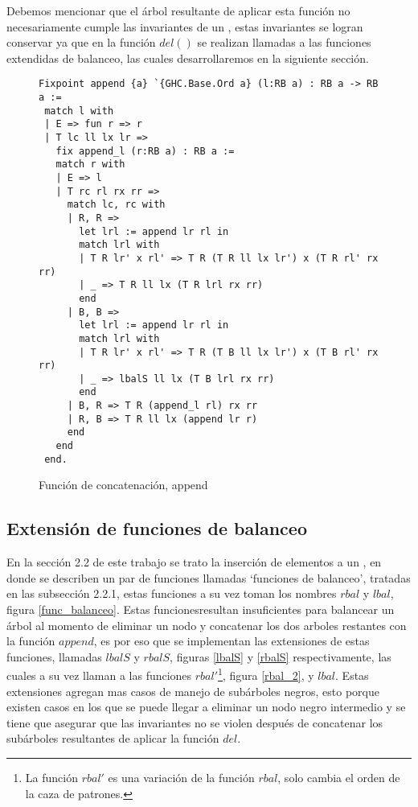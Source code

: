 Debemos mencionar que el \'arbol resultante de aplicar esta funci\'on no necesariamente cumple las
invariantes de un {\arn}, estas invariantes se logran conservar ya que en la funci\'on $del()$ se
realizan llamadas a las funciones extendidas de balanceo, las cuales desarrollaremos en la
siguiente sección.

\begin{figure}
\centering
\captionsetup{justification=centering}
\begin{verbatim}
Fixpoint append {a} `{GHC.Base.Ord a} (l:RB a) : RB a -> RB a :=
 match l with
 | E => fun r => r
 | T lc ll lx lr =>
   fix append_l (r:RB a) : RB a :=
   match r with
   | E => l
   | T rc rl rx rr =>
     match lc, rc with
     | R, R =>
       let lrl := append lr rl in
       match lrl with
       | T R lr' x rl' => T R (T R ll lx lr') x (T R rl' rx rr)
       | _ => T R ll lx (T R lrl rx rr)
       end
     | B, B =>
       let lrl := append lr rl in
       match lrl with
       | T R lr' x rl' => T R (T B ll lx lr') x (T B rl' rx rr)
       | _ => lbalS ll lx (T B lrl rx rr)
       end
     | B, R => T R (append_l rl) rx rr
     | R, B => T R ll lx (append lr r)
     end
   end
 end.
\end{verbatim}
\caption{Funci\'on de concatenaci\'on, append}
\label{func_app}
\end{figure}

\subsection{Extensi\'on de funciones de balanceo}

En la secci\'on 2.2 de este trabajo se trato la inserci\'on de elementos a un {\arn}, en donde se
describen un par de funciones llamadas `funciones de balanceo', tratadas en las subsecci\'on
2.2.1, estas funciones a su vez toman los nombres $rbal$ y $lbal$, figura \ref{func_balanceo}.
Estas funcionesresultan insuficientes para balancear un \'arbol al momento de eliminar un nodo y
concatenar los dos arboles restantes con la función $append$, es por eso que se implementan las
extensiones de estas funciones, llamadas $lbalS$ y $rbalS$, figuras \ref{lbalS} y \ref{rbalS}
respectivamente, las cuales a su vez llaman a las funciones $rbal'$\footnote{La funci\'on $rbal'$
es una variación de la función $rbal$, solo cambia el orden de la caza de patrones.}, figura
\ref{rbal_2}, y $lbal$. Estas extensiones
agregan mas casos de manejo de subárboles negros, esto porque existen casos en los que se puede
llegar a eliminar un nodo negro intermedio y se tiene que asegurar que las invariantes no se
violen después de concatenar los subárboles resultantes de aplicar la función $del$.

